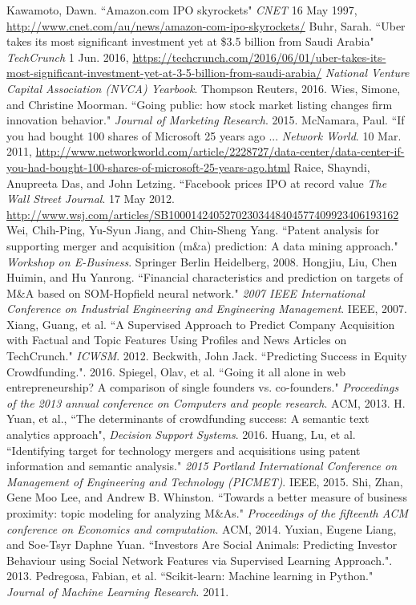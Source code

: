 \documentclass[12pt, a4paper]{article}
\begin{document}
\begin{thebibliography}{9}
 Kawamoto, Dawn. {``Amazon.com IPO skyrockets"} {\em CNET} 16 May 1997, \url{http://www.cnet.com/au/news/amazon-com-ipo-skyrockets/}
 Buhr, Sarah. {``Uber takes its most significant investment yet at \$3.5 billion from Saudi Arabia"} {\em TechCrunch} 1 Jun. 2016, \url{https://techcrunch.com/2016/06/01/uber-takes-its-most-significant-investment-yet-at-3-5-billion-from-saudi-arabia/}
 {\em National Venture Capital Association (NVCA) Yearbook}. Thompson Reuters, 2016.
 Wies, Simone, and Christine Moorman. {``Going public: how stock market listing changes firm innovation behavior."} {\em Journal of Marketing Research}. 2015.
 McNamara, Paul. {``If you had bought 100 shares of Microsoft 25 years ago ...} {\em Network World}. 10 Mar. 2011, \url{http://www.networkworld.com/article/2228727/data-center/data-center-if-you-had-bought-100-shares-of-microsoft-25-years-ago.html}
 Raice, Shayndi, Anupreeta Das, and John Letzing. {``Facebook prices IPO at record value} {\em The Wall Street Journal}. 17 May 2012. \url{http://www.wsj.com/articles/SB10001424052702303448404577409923406193162}
 Wei, Chih-Ping, Yu-Syun Jiang, and Chin-Sheng Yang. {``Patent analysis for supporting merger and acquisition (m\&a) prediction: A data mining approach."} {\em Workshop on E-Business}. Springer Berlin Heidelberg, 2008.
 Hongjiu, Liu, Chen Huimin, and Hu Yanrong. {``Financial characteristics and prediction on targets of M\&A based on SOM-Hopfield neural network."} {\em 2007 IEEE International Conference on Industrial Engineering and Engineering Management}. IEEE, 2007.
 Xiang, Guang, et al. {``A Supervised Approach to Predict Company Acquisition with Factual and Topic Features Using Profiles and News Articles on TechCrunch."} {\em ICWSM}. 2012.
 Beckwith, John Jack. {``Predicting Success in Equity Crowdfunding."}. 2016.
 Spiegel, Olav, et al. {``Going it all alone in web entrepreneurship? A comparison of single founders vs. co-founders."} {\em Proceedings of the 2013 annual conference on Computers and people research}. ACM, 2013.
 H. Yuan, et al., {``The determinants of crowdfunding success: A semantic text analytics approach"}, {\em Decision Support Systems}. 2016.
 Huang, Lu, et al. {``Identifying target for technology mergers and acquisitions using patent information and semantic analysis."} {\em 2015 Portland International Conference on Management of Engineering and Technology (PICMET)}. IEEE, 2015.
 Shi, Zhan, Gene Moo Lee, and Andrew B. Whinston. {``Towards a better measure of business proximity: topic modeling for analyzing M\&As."} {\em Proceedings of the fifteenth ACM conference on Economics and computation}. ACM, 2014.
 Yuxian, Eugene Liang, and Soe-Tsyr Daphne Yuan. {``Investors Are Social Animals: Predicting Investor Behaviour using Social Network Features via Supervised Learning Approach."}. 2013.
 Pedregosa, Fabian, et al. {``Scikit-learn: Machine learning in Python."} {\em Journal of Machine Learning Research}. 2011.
\end{thebibliography}
\end{document}

